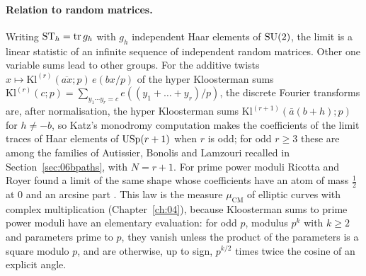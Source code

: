 \paragraph{Relation to random matrices.} Writing $\mathrm{ST}_h=\operatorname{tr} g_h$ with $g_h$ independent Haar elements of $\mathrm{SU}(2)$, the limit is a linear statistic of an infinite sequence of independent random matrices. Other one variable sums lead to other groups. For the additive twists $x\mapsto\mathrm{Kl}^{(r)}(\overline{ax};p)\,e(bx/p)$ of the hyper Kloosterman sums $\mathrm{Kl}^{(r)}(c;p)=\sum_{y_1\cdots y_r=c}e((y_1+\dots+y_r)/p)$, the discrete Fourier transforms are, after normalisation, the hyper Kloosterman sums $\mathrm{Kl}^{(r+1)}(\bar a(b+h);p)$ for $h\ne-b$, so Katz's monodromy computation makes the coefficients of the limit traces of Haar elements of $\mathrm{USp}(r+1)$ when $r$ is odd; for odd $r\ge3$ these are among the families of Autissier, Bonolis and Lamzouri recalled in Section~\ref{sec:06bpaths}, with $N=r+1$. For prime power moduli Ricotta and Royer found a limit of the same shape whose coefficients have an atom of mass $\frac12$ at $0$ and an arcsine part \cite{ricottaroyer2018}. This law is the measure $\mu_{\mathrm{CM}}$ of elliptic curves with complex multiplication (Chapter~\ref{ch:04}), because Kloosterman sums to prime power moduli have an elementary evaluation: for odd $p$, modulus $p^k$ with $k\ge2$ and parameters prime to $p$, they vanish unless the product of the parameters is a square modulo $p$, and are otherwise, up to sign, $p^{k/2}$ times twice the cosine of an explicit angle.

